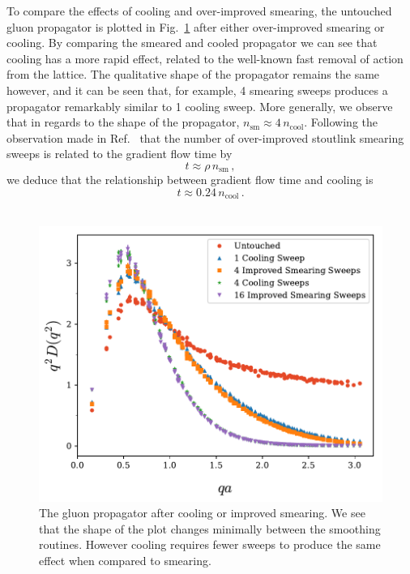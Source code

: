 To compare the effects of cooling and over-improved smearing, the untouched gluon propagator is plotted in Fig.~\ref{fig:SmearCoolComp} after either over-improved smearing or cooling. By comparing the smeared and cooled propagator we can see that cooling has a more rapid effect, related to the well-known fast removal of action from the lattice. The qualitative shape of the propagator remains the same however, and it can be seen that, for example, 4 smearing sweeps produces a propagator remarkably similar to 1 cooling sweep. More generally, we observe that in regards to the shape of the propagator, $n_{\text{sm}}\approx4\,n_{\text{cool}}$. Following the observation made in Ref.~\cite{Thomas:2014tda} that the number of over-improved stoutlink smearing sweeps is related to the gradient flow time by
%
\begin{equation}
t\approx\rho\,n_{\text{sm}}\, ,
\end{equation}
%
we deduce that the relationship between gradient flow time and cooling is
\begin{equation}
t\approx0.24\,n_{\text{cool}}\,.
\end{equation}\\
%
\begin{figure}[tb]
\centering
\includegraphics[width=\linewidth]{./ScalarGluComp_q2_SmearCoolComp.pdf}
\caption[The gluon propagator after cooling or improved smearing.]{\label{fig:SmearCoolComp}The gluon propagator after cooling or improved smearing. We see that the shape of the plot changes minimally between the smoothing routines. However cooling requires fewer sweeps to produce the same effect when compared to smearing.}
\end{figure}
%

